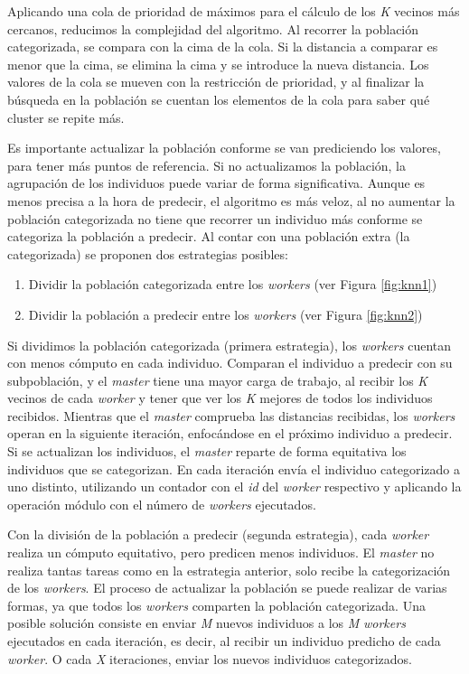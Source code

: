 		Aplicando una cola de prioridad de máximos para el cálculo de los \textit{K} vecinos más cercanos, reducimos la complejidad del algoritmo. Al recorrer la población categorizada, se compara con la cima de la cola. Si la distancia a comparar es menor que la cima, se elimina la cima y se introduce la nueva distancia. Los valores de la cola se mueven con la restricción de prioridad, y al finalizar la búsqueda en la población se cuentan los elementos de la cola para saber qué cluster se repite más.
		
		Es importante actualizar la población conforme se van prediciendo los valores, para tener más puntos de referencia. Si no actualizamos la población, la agrupación de los individuos puede variar de forma significativa. Aunque es menos precisa a la hora de predecir, el algoritmo es más veloz, al no aumentar la población categorizada no tiene que recorrer un individuo más conforme se categoriza la población a predecir. Al contar con una población extra (la categorizada) se proponen dos estrategias posibles:
		
		
		\begin{enumerate}
			\item Dividir la población categorizada entre los \textit{workers} (ver Figura \ref{fig:knn1})
			\item Dividir la población a predecir entre los \textit{workers} (ver Figura \ref{fig:knn2})
		\end{enumerate}
		
		Si dividimos la población categorizada (primera estrategia), los \textit{workers} cuentan con menos cómputo en cada individuo. Comparan el individuo a predecir con su subpoblación, y el \textit{master} tiene una mayor carga de trabajo, al recibir los \textit{K} vecinos de cada \textit{worker} y tener que ver los \textit{K} mejores de todos los individuos recibidos.  Mientras que el \textit{master} comprueba las distancias recibidas, los \textit{workers} operan en la siguiente iteración, enfocándose en el próximo individuo a predecir. Si se actualizan los individuos, el \textit{master} reparte de forma equitativa los individuos que se categorizan. En cada iteración envía el individuo categorizado a uno distinto, utilizando un contador con el \textit{id} del \textit{worker} respectivo y aplicando la operación módulo con el número de \textit{workers} ejecutados.
		
		Con la división de la población a predecir (segunda estrategia), cada \textit{worker} realiza un cómputo equitativo, pero predicen menos individuos. El \textit{master} no realiza tantas tareas como en la estrategia anterior, solo recibe la categorización de los \textit{workers}. El proceso de actualizar la población se puede realizar de varias formas, ya que todos los \textit{workers} comparten la población categorizada. Una posible solución consiste en enviar \textit{M} nuevos individuos a los \textit{M} \textit{workers} ejecutados en cada iteración, es decir, al recibir un individuo predicho de cada \textit{worker}. O cada \textit{X} iteraciones, enviar los nuevos individuos categorizados.
		
